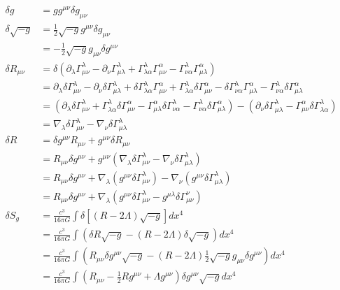    \begin{align*}
        \delta g
            &= g g^{\mu\nu} \delta g_{\mu\nu}\\
        \delta \sqrt{-g}
            &= \frac{1}{2}\sqrt{-g}g^{\mu\nu}\delta g_{\mu\nu}\\
            &= -\frac{1}{2}\sqrt{-g}g_{\mu\nu}\delta g^{\mu\nu}\\
        \delta R_{\mu\nu}
            &= \delta(\partial_\lambda \Gamma^\lambda_{\mu\nu} - \partial_\nu \Gamma^\lambda_{\mu\lambda} + \Gamma^\lambda_{\lambda\alpha}\Gamma^\alpha_{\mu\nu} - \Gamma^\lambda_{\nu\alpha}\Gamma^\alpha_{\mu\lambda})\\
            &= \partial_\lambda \delta\Gamma^\lambda_{\mu\nu} - \partial_\nu \delta\Gamma^\lambda_{\mu\lambda} + \delta\Gamma^\lambda_{\lambda\alpha} \Gamma^\alpha_{\mu\nu} + \Gamma^\lambda_{\lambda\alpha} \delta\Gamma^\alpha_{\mu\nu} - \delta\Gamma^\lambda_{\nu\alpha} \Gamma^\alpha_{\mu\lambda} - \Gamma^\lambda_{\nu\alpha} \delta\Gamma^\alpha_{\mu\lambda}\\
            &= (\partial_\lambda \delta\Gamma^\lambda_{\mu\nu} + \Gamma^\lambda_{\lambda\alpha} \delta\Gamma^\alpha_{\mu\nu} - \Gamma^\alpha_{\mu\lambda} \delta\Gamma^\lambda_{\nu\alpha} - \Gamma^\lambda_{\nu\alpha} \delta\Gamma^\alpha_{\mu\lambda}) - (\partial_\nu \delta\Gamma^\lambda_{\mu\lambda} - \Gamma^\alpha_{\mu\nu} \delta\Gamma^\lambda_{\lambda\alpha})\\
            &= \nabla_\lambda \delta\Gamma^\lambda_{\mu\nu} - \nabla_\nu \delta\Gamma^\lambda_{\mu\lambda}\\
        \delta R
            &= \delta g^{\mu\nu} R_{\mu\nu} + g^{\mu\nu} \delta R_{\mu\nu}\\
            &= R_{\mu\nu} \delta g^{\mu\nu} + g^{\mu\nu} (\nabla_\lambda \delta\Gamma^\lambda_{\mu\nu} - \nabla_\nu \delta\Gamma^\lambda_{\mu\lambda})\\
            &= R_{\mu\nu} \delta g^{\mu\nu} +  \nabla_\lambda (g^{\mu\nu} \delta\Gamma^\lambda_{\mu\nu}) - \nabla_\nu(g^{\mu\nu} \delta\Gamma^\lambda_{\mu\lambda})\\
            &= R_{\mu\nu} \delta g^{\mu\nu} +  \nabla_\lambda(g^{\mu\nu} \delta\Gamma^\lambda_{\mu\nu} - g^{\mu\lambda} \delta\Gamma^\nu_{\mu\nu})\\
        \delta S_g
            &= \frac{c^3}{16\pi G} \int \delta\left[(R - 2\Lambda)\sqrt{-g}\right] dx^4\\
            &= \frac{c^3}{16\pi G} \int (\delta R \sqrt{-g} - (R - 2\Lambda)\delta \sqrt{-g}) dx^4\\
            &= \frac{c^3}{16\pi G} \int \left(R_{\mu\nu} \delta g^{\mu\nu} \sqrt{-g} - (R - 2\Lambda)\frac{1}{2}\sqrt{-g}g_{\mu\nu}\delta g^{\mu\nu}\right) dx^4\\
            &= \frac{c^3}{16\pi G} \int \left(R_{\mu\nu} - \frac{1}{2}Rg^{\mu\nu} + \Lambda g^{\mu\nu}\right) \delta g^{\mu\nu} \sqrt{-g} dx^4
    \end{align*}
